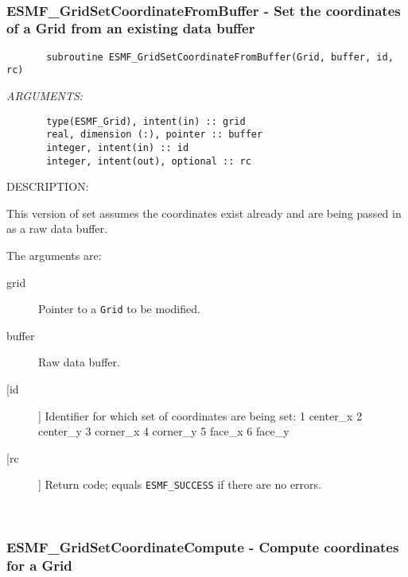 {%
 
\mbox{}\hrulefill\ 
 
\subsubsection{ESMF\_GridSetCoordinateFromBuffer - Set the coordinates of a Grid from an existing data buffer}


 
\begin{verbatim}       subroutine ESMF_GridSetCoordinateFromBuffer(Grid, buffer, id, rc)\end{verbatim}{\em ARGUMENTS:}
\begin{verbatim}       type(ESMF_Grid), intent(in) :: grid
       real, dimension (:), pointer :: buffer
       integer, intent(in) :: id            
       integer, intent(out), optional :: rc            \end{verbatim}
{\sf DESCRIPTION:\\ }


       This version of set assumes the coordinates exist already and are being
       passed in as a raw data buffer.
  
       The arguments are:
       \begin{description}
       \item[grid] 
            Pointer to a {\tt Grid} to be modified.
       \item[buffer]
            Raw data buffer.         
       \item[[id]]
            Identifier for which set of coordinates are being set:
               1  center\_x
               2  center\_y
               3  corner\_x
               4  corner\_y
               5  face\_x
               6  face\_y 
       \item[[rc]] 
            Return code; equals {\tt ESMF\_SUCCESS} if there are no errors.
       \end{description}
   
 
\mbox{}\hrulefill\ 
 
\subsubsection{ESMF\_GridSetCoordinateCompute - Compute coordinates for a Grid}


}
